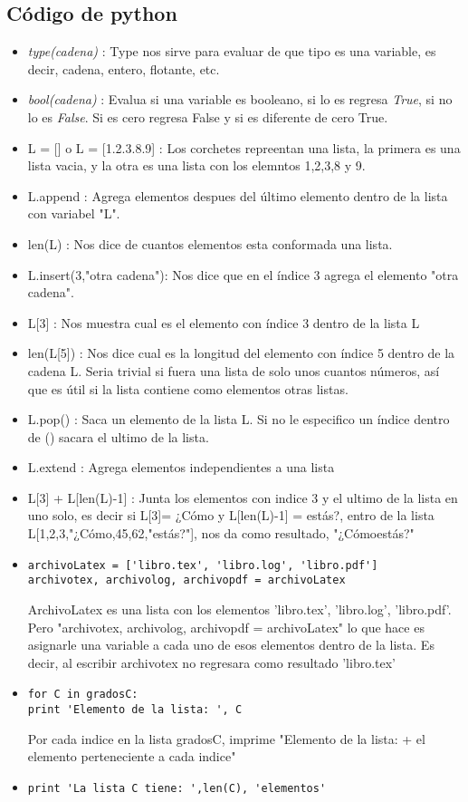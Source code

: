 \documentclass{book}
\begin{document}
	\subsection{Código de python}
	\begin{itemize}
		\item {\textit{type(cadena)}} : Type nos sirve para evaluar de que tipo es una variable, es decir, cadena, entero, flotante, etc.
		\item {\textit{bool(cadena)}} : Evalua si una variable es booleano, si lo es regresa {\textit{True}}, si no lo es {\textit{False}}. Si es cero regresa False y si es diferente de cero True.
		\item L = [] o L = [1.2.3.8.9] : Los corchetes repreentan una lista, la primera es una lista vacia, y la otra es una lista con los elemntos 1,2,3,8 y 9.
		\item L.append : Agrega elementos despues del último elemento dentro de la lista con variabel "L".
		\item len(L) : Nos dice de cuantos elementos esta conformada una lista.
		\item L.insert(3,"otra cadena"): Nos dice que  en el índice 3 agrega el elemento "otra cadena".
		\item L[3] : Nos muestra cual es el elemento con índice 3 dentro de la lista L
		\item len(L[5]) : Nos dice cual es la longitud del elemento con índice 5  dentro de la cadena L. Seria trivial si fuera una lista de solo unos cuantos números, así que es útil si la lista contiene como elementos otras listas.
		\item L.pop() : Saca un elemento de la lista L. Si no le especifico un índice dentro de () sacara el ultimo de la lista.
		\item L.extend : Agrega elementos independientes a una lista
		\item L[3] + L[len(L)-1] : Junta los elementos con indice 3 y el ultimo de la lista en uno solo, es decir si L[3]= ¿Cómo y L[len(L)-1] = estás?, entro de la lista L[1,2,3,"¿Cómo,45,62,"estás?"], nos da como resultado, "¿Cómoestás?"
		\item 
		\begin{lstlisting}
archivoLatex = ['libro.tex', 'libro.log', 'libro.pdf']
archivotex, archivolog, archivopdf = archivoLatex
		\end{lstlisting} ArchivoLatex es una lista con los elementos 'libro.tex', 'libro.log', 'libro.pdf'. Pero "archivotex, archivolog, archivopdf = archivoLatex" lo que hace es asignarle una variable a cada uno de esos elementos dentro de la lista. Es decir, al escribir archivotex no regresara como resultado 'libro.tex'
		\item 
		\begin{lstlisting}
for C in gradosC:
print 'Elemento de la lista: ', C
		\end{lstlisting} Por cada indice en la lista gradosC, imprime "Elemento de la lista: + el elemento perteneciente a cada indice" 
		\item 
		\begin{lstlisting}
print 'La lista C tiene: ',len(C), 'elementos'
		\end{lstlisting} ~
		

\end{itemize}
\end{document}
